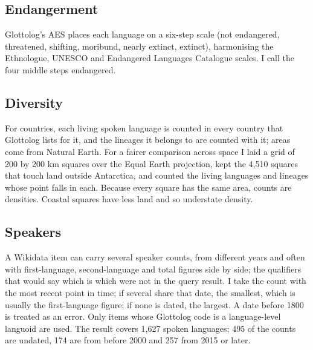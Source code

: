 \documentclass[11pt,a4paper]{article}
\begin{document}
\subsection{Endangerment}
Glottolog's AES places each language on a six-step scale (not endangered, threatened, shifting, moribund, nearly extinct, extinct), harmonising the Ethnologue, UNESCO and Endangered Languages Catalogue scales. I call the four middle steps endangered.

\subsection{Diversity}
For countries, each living spoken language is counted in every country that Glottolog lists for it, and the lineages it belongs to are counted with it; areas come from Natural Earth. For a fairer comparison across space I laid a grid of 200 by 200 km squares over the Equal Earth projection, kept the 4,510 squares that touch land outside Antarctica, and counted the living languages and lineages whose point falls in each. Because every square has the same area, counts are densities. Coastal squares have less land and so understate density.

\subsection{Speakers}
A Wikidata item can carry several speaker counts, from different years and often with first-language, second-language and total figures side by side; the qualifiers that would say which is which were not in the query result. I take the count with the most recent point in time; if several share that date, the smallest, which is usually the first-language figure; if none is dated, the largest. A date before 1800 is treated as an error. Only items whose Glottolog code is a language-level languoid are used. The result covers 1,627 spoken languages; 495 of the counts are undated, 174 are from before 2000 and 257 from 2015 or later.
\end{document}
